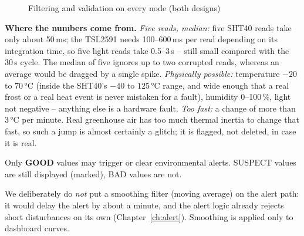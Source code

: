 \documentclass[11pt,a4paper]{report}
\newcommand{\why}[1]{\par\noindent\colorbox{gray!10}{\parbox{\dimexpr\linewidth-2\fboxsep}{\small\textbf{Where the numbers come from.} #1}}\par}
\begin{document}
\begin{figure}[htbp]
\centering
{}
\caption{Filtering and validation on every node (both designs)}\label{fig:filter}
\end{figure}

\why{\emph{Five reads, median:} five SHT40 reads take only about 50\,ms; the TSL2591 needs 100--600\,ms per read depending on its integration time, so five light reads take 0.5--3\,s -- still small compared with the 30\,s cycle. The median of five ignores up to two corrupted reads, whereas an average would be dragged by a single spike. \emph{Physically possible:} temperature $-20$ to $70$\,°C (inside the SHT40's $-40$ to $125$\,°C range, and wide enough that a real frost or a real heat event is never mistaken for a fault), humidity 0--100\,\%, light not negative -- anything else is a hardware fault. \emph{Too fast:} a change of more than 3\,°C per minute. Real greenhouse air has too much thermal inertia to change that fast, so such a jump is almost certainly a glitch; it is flagged, not deleted, in case it is real.}

Only \textbf{GOOD} values may trigger or clear environmental alerts. SUSPECT values are still displayed (marked), BAD values are not.

We deliberately do \emph{not} put a smoothing filter (moving average) on the alert path: it would delay the alert by about a minute, and the alert logic already rejects short disturbances on its own (Chapter~\ref{ch:alert}). Smoothing is applied only to dashboard curves.
\end{document}
